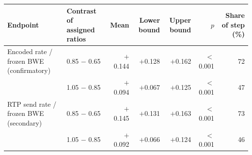 \begin{tabular}{llrrrrr}
\toprule
Endpoint & Contrast of assigned ratios & Mean & Lower bound & Upper bound & $p$ & Share of step (\%) \\
\midrule
Encoded rate / frozen BWE (confirmatory) & 0.85 $-$ 0.65 & $+$0.144 & $+$0.128 & $+$0.162 & $<$0.001 & 72 \\
 & 1.05 $-$ 0.85 & $+$0.094 & $+$0.067 & $+$0.125 & $<$0.001 & 47 \\
RTP send rate / frozen BWE (secondary) & 0.85 $-$ 0.65 & $+$0.145 & $+$0.131 & $+$0.163 & $<$0.001 & 73 \\
 & 1.05 $-$ 0.85 & $+$0.092 & $+$0.066 & $+$0.124 & $<$0.001 & 46 \\
\bottomrule
\end{tabular}
